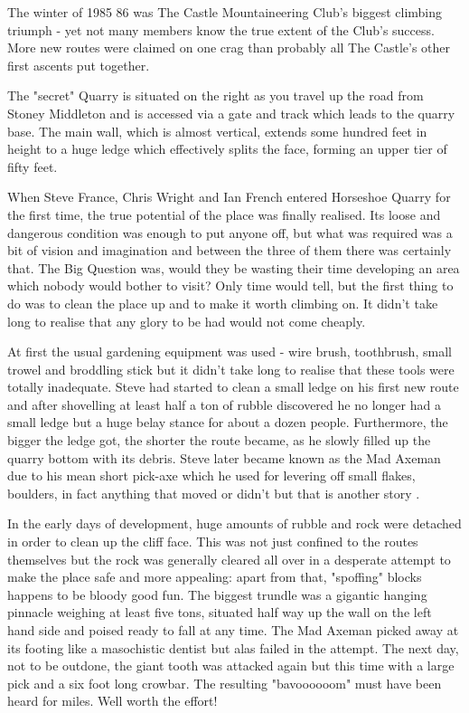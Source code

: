 \documentclass[a5paper,openany,font 10pt]{scrbook}
\begin{document}
The winter of 1985 86 was The Castle Mountaineering Club's
biggest climbing triumph - yet not many members know the true
extent of the Club's success. More new routes were claimed on one
crag than probably all The Castle's other first ascents put
together.

The "secret" Quarry is situated on the right as you travel
up the road from Stoney Middleton and is accessed via a gate and
track which leads to the quarry base. The main wall, which is
almost vertical, extends some hundred feet in height to a huge
ledge which effectively splits the face, forming an upper tier of
fifty feet.

When Steve France, Chris Wright and Ian French entered
Horseshoe Quarry for the first time, the true potential of the
place was finally realised. Its loose and dangerous condition was
enough to put anyone off, but what was required was a bit of
vision and imagination and between the three of them there was
certainly that. The Big Question was, would they be wasting their
time developing an area which nobody would bother to visit? Only
time would tell, but the first thing to do was to clean the place
up and to make it worth climbing on. It didn't take long to
realise that any glory to be had would not come cheaply.

At first the usual gardening equipment was used -  wire
brush, toothbrush, small trowel and broddling stick   but it
didn't take long to realise that these tools were totally
inadequate. Steve had started to clean a small ledge on his first
new route and after shovelling at least half a ton of rubble
discovered he no longer had a small ledge but a huge belay stance
for about a dozen people. Furthermore, the bigger the ledge got,
the shorter the route became, as he slowly filled up the quarry
bottom with its debris. Steve later became known as the Mad
Axeman due to his mean short pick-axe which he used for levering
off small flakes, boulders, in fact anything that moved  or
didn't   but that is another story .

In the early days of development, huge amounts of rubble and
rock were detached in order to clean up the cliff face. This was
not just confined to the routes themselves but the rock was
generally cleared all over in a desperate attempt to make the
place safe and more appealing: apart from that, "spoffing" blocks
happens to be bloody good fun. The biggest trundle was a gigantic
hanging pinnacle weighing at least five tons, situated half way
up the wall on the left hand side and poised ready to fall at any
time. The Mad Axeman picked away at its footing like a
masochistic dentist but alas failed in the attempt. The next day,
not to be outdone, the giant tooth was attacked again but this
time with a large pick and a six foot long crowbar. The resulting
"bavoooooom" must have been heard for miles. Well worth the
effort!
\end{document}
